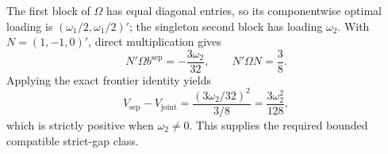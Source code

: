 The first block of \(\Omega\) has equal diagonal entries, so its componentwise optimal loading is \((\omega_1/2,\omega_1/2)'\); the singleton second block has loading \(\omega_2\).  With \(N=(1,-1,0)'\), direct multiplication gives
\[
 N'\Omega b^{\mathrm{sep}}=-\frac{3\omega_2}{32},
 \qquad
 N'\Omega N=\frac38.
\]
Applying the exact frontier identity yields
\[
 V_{\mathrm{sep}}-V_{\mathrm{joint}}
 =\frac{(3\omega_2/32)^2}{3/8}
 =\frac{3\omega_2^2}{128},
\]
which is strictly positive when \(\omega_2\ne0\).  This supplies the required bounded compatible strict-gap class.